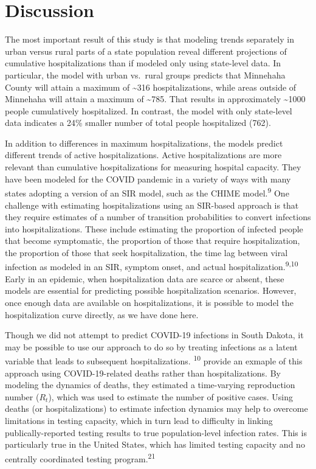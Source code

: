 \documentclass[
]{article}
\begin{document}
\hypertarget{discussion}{%
\section{Discussion}\label{discussion}}

The most important result of this study is that modeling trends separately in urban versus rural parts of a state population reveal different projections of cumulative hospitalizations than if modeled only using state-level data. In particular, the model with urban vs.~rural groups predicts that Minnehaha County will attain a maximum of \textasciitilde316 hospitalizations, while areas outside of Minnehaha will attain a maximum of \textasciitilde785. That results in approximately \textasciitilde1000 people cumulatively hospitalized. In contrast, the model with only state-level data indicates a 24\% smaller number of total people hospitalized (762).

In addition to differences in maximum hospitalizations, the models predict different trends of active hospitalizations. Active hospitalizations are more relevant than cumulative hospitalizations for measuring hospital capacity. They have been modeled for the COVID pandemic in a variety of ways with many states adopting a version of an SIR model, such as the CHIME model.\textsuperscript{9} One challenge with estimating hospitalizations using an SIR-based approach is that they require estimates of a number of transition probabilities to convert infections into hospitalizations. These include estimating the proportion of infected people that become symptomatic, the proportion of those that require hospitalization, the proportion of those that seek hospitalization, the time lag between viral infection as modeled in an SIR, symptom onset, and actual hospitalization.\textsuperscript{9,10} Early in an epidemic, when hospitalization data are scarce or absent, these models are essential for predicting possible hospitalization scenarios. However, once enough data are available on hospitalizations, it is possible to model the hospitalization curve directly, as we have done here.

Though we did not attempt to predict COVID-19 infections in South Dakota, it may be possible to use our approach to do so by treating infections as a latent variable that leads to subsequent hospitalizations. \textsuperscript{10} provide an exmaple of this approach using COVID-19-related deaths rather than hospitalizations. By modeling the dynamics of deaths, they estimated a time-varying reproduction number (\(R_t\)), which was used to estimate the number of positive cases. Using deaths (or hospitalizations) to estimate infection dynamics may help to overcome limitations in testing capacity, which in turn lead to difficulty in linking publically-reported testing results to true population-level infection rates. This is particularly true in the United States, which has limited testing capacity and no centrally coordinated testing program.\textsuperscript{21}
\end{document}
